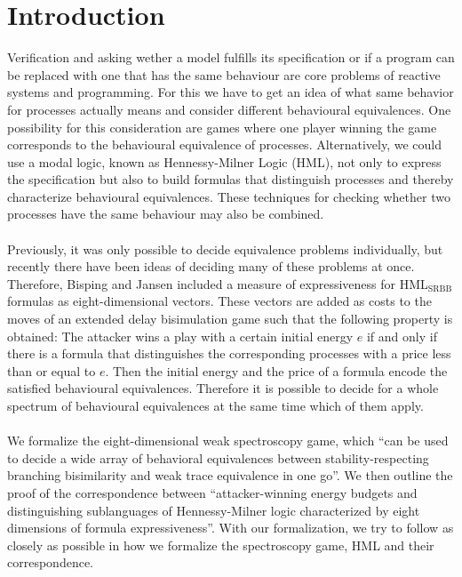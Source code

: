 \newpage
\section{Introduction} %
Verification and asking wether a model fulfills its specification or if a program can be replaced with one that has the same behaviour are core problems of reactive systems and programming.
For this we have to get an idea of what same behavior for processes actually means and consider different behavioural equivalences.
One possibility for this consideration are games where one player winning the game corresponds to the behavioural equivalence of processes.
Alternatively, we could use a modal logic, known as Hennessy-Milner Logic (HML), not only to express the specification but also to build formulas that distinguish processes and 
thereby characterize behavioural equivalences.
These techniques for checking whether two processes have the same behaviour may also be combined.
\\\\
Previously, it was only possible to decide equivalence problems individually, but recently there have been ideas of deciding many of these problems at once.
Therefore, Bisping and Jansen \cite{bisping2023lineartimebranchingtime} included a measure of expressiveness for HML$_\text{{SRBB}}$ formulas as eight-dimensional vectors.
These vectors are added as costs to the moves of an extended delay bisimulation game such that the following property is obtained: 
The attacker wins a play with a certain initial energy $e$ if and only if there is a formula that distinguishes the corresponding processes with a price less than or equal to $e$.
Then the initial energy and the price of a formula encode the satisfied behavioural equivalences.
Therefore it is possible to decide for a whole spectrum of behavioural equivalences at the same time which of them apply.
\\\\
We formalize the eight-dimensional weak spectroscopy game, 
which ``can be used to decide a wide array of behavioral equivalences between stability-respecting branching bisimilarity and weak trace equivalence in one go''\cite{bisping2023lineartimebranchingtime}.
We then outline the proof of the correspondence between ``attacker-winning energy budgets and distinguishing sublanguages of Hennessy-Milner logic characterized by eight dimensions of formula expressiveness''.
With our formalization, we try to follow \cite{bisping2023lineartimebranchingtime} as closely as possible in how we formalize the spectroscopy game, HML and their correspondence.
